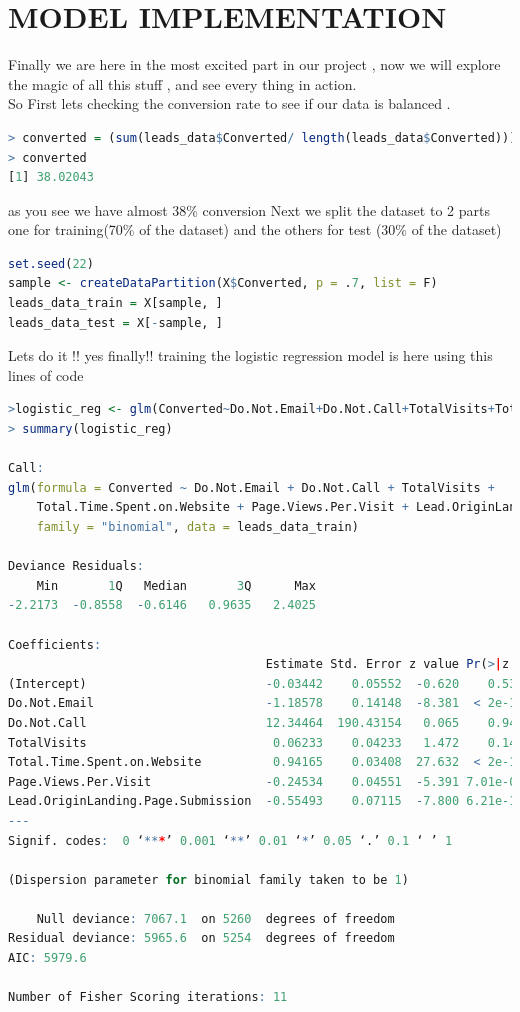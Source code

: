 \section{MODEL IMPLEMENTATION}  
Finally we are here in the most excited part in our project , now we will explore the magic of all this stuff , and see every thing in action.\\
So First lets checking the conversion rate to see if our data is balanced . 

\begin{lstlisting}[language=R]
> converted = (sum(leads_data$Converted/ length(leads_data$Converted)))*100
> converted
[1] 38.02043
\end{lstlisting}
as you see we have  almost 38\% conversion 
Next we split the dataset to 2 parts one for training(70\% of the dataset) and the others for test (30\% of the dataset)
\begin{lstlisting}[language=R]
set.seed(22)
sample <- createDataPartition(X$Converted, p = .7, list = F)
leads_data_train = X[sample, ]
leads_data_test = X[-sample, ]
\end{lstlisting}
Lets do it !! yes finally!! training the logistic regression model is here using this lines of code 
\begin{lstlisting}[language=R]
>logistic_reg <- glm(Converted~Do.Not.Email+Do.Not.Call+TotalVisits+Total.Time.Spent.on.Website+Page.Views.Per.Visit+Lead.OriginLanding.Page.Submission, family = "binomial", data = leads_data_train)
> summary(logistic_reg)

Call:
glm(formula = Converted ~ Do.Not.Email + Do.Not.Call + TotalVisits + 
    Total.Time.Spent.on.Website + Page.Views.Per.Visit + Lead.OriginLanding.Page.Submission, 
    family = "binomial", data = leads_data_train)

Deviance Residuals: 
    Min       1Q   Median       3Q      Max  
-2.2173  -0.8558  -0.6146   0.9635   2.4025  

Coefficients:
                                    Estimate Std. Error z value Pr(>|z|)    
(Intercept)                         -0.03442    0.05552  -0.620    0.535    
Do.Not.Email                        -1.18578    0.14148  -8.381  < 2e-16 ***
Do.Not.Call                         12.34464  190.43154   0.065    0.948    
TotalVisits                          0.06233    0.04233   1.472    0.141    
Total.Time.Spent.on.Website          0.94165    0.03408  27.632  < 2e-16 ***
Page.Views.Per.Visit                -0.24534    0.04551  -5.391 7.01e-08 ***
Lead.OriginLanding.Page.Submission  -0.55493    0.07115  -7.800 6.21e-15 ***
---
Signif. codes:  0 ‘***’ 0.001 ‘**’ 0.01 ‘*’ 0.05 ‘.’ 0.1 ‘ ’ 1

(Dispersion parameter for binomial family taken to be 1)

    Null deviance: 7067.1  on 5260  degrees of freedom
Residual deviance: 5965.6  on 5254  degrees of freedom
AIC: 5979.6

Number of Fisher Scoring iterations: 11
\end{lstlisting}
